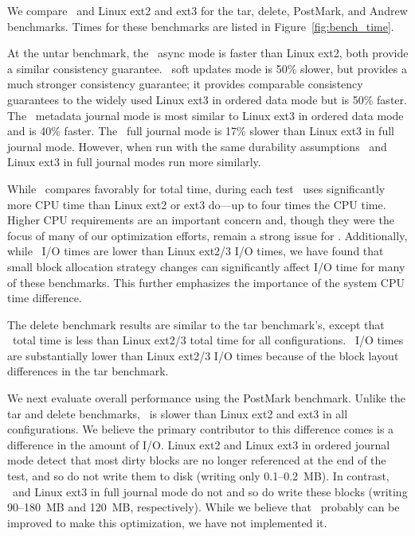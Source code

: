 We compare \Kudos\ and Linux ext2 and ext3 for the tar, delete,
PostMark, and Andrew benchmarks. Times for these benchmarks are listed
in Figure~\ref{fig:bench_time}.

\benchtable{}

At the untar benchmark, the \Kudos\ async mode is faster than Linux
ext2, both provide a similar consistency guarantee.
%
\Kudos\ soft updates mode is 50\% slower, but provides a much stronger
consistency guarantee; it provides comparable consistency guarantees
to the widely used Linux ext3 in ordered data mode but is 50\% faster.
%
The \Kudos\ metadata journal mode is most similar to Linux ext3 in
ordered data mode and is 40\% faster.
%
The \Kudos\ full journal mode is 17\% slower than Linux ext3 in full
journal mode.
%
However, when run with the same durability assumptions \Kudos\ and
Linux ext3 in full journal modes run more similarly.

While \Kudos\ compares favorably for total time, during each test
\Kudos\ uses significantly more CPU time than Linux ext2 or ext3
do---up to four times the CPU time.
%
Higher CPU requirements are an important concern and, though they were
the focus of many of our optimization efforts, remain a strong issue
for \Kudos.
%
Additionally, while \Kudos\ I/O times are lower than Linux ext2/3 I/O
times, we have found that small block allocation strategy changes can
significantly affect I/O time for many of these benchmarks. This further
emphasizes the importance of the system CPU time difference.


The delete benchmark results are similar to the tar benchmark's,
except that \Kudos\ total time is less than Linux ext2/3 total time
for all configurations. \Kudos\ I/O times are substantially lower
than Linux ext2/3 I/O times because of the block layout differences in
the tar benchmark.

We next evaluate overall performance using the PostMark benchmark.
Unlike the tar and delete benchmarks, \Kudos\ is slower than Linux
ext2 and ext3 in all configurations.
%
We believe the primary contributor to this difference comes is a
difference in the amount of I/O. Linux ext2 and Linux ext3 in ordered
journal mode detect that most dirty blocks are no longer referenced at
the end of the test, and so do not write them to disk (writing only
0.1--0.2~MB). In contrast, \Kudos\ and Linux ext3 in full journal mode
do not and so do write these blocks (writing 90--180~MB and 120~MB,
respectively).
%
While we believe that \Kudos\ probably can be improved to make this
optimization, we have not implemented it.
%

